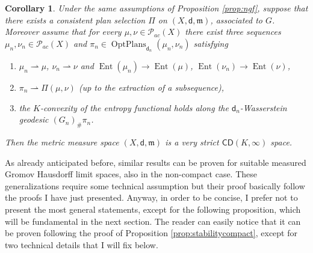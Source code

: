 \documentclass[11pt,twoside,a4paper]{article}
\newcommand{\weakto}{\rightharpoonup}
\newcommand{\CD}{\mathsf{CD}}
\newcommand{\di}{\mathsf d} %
\newcommand{\m}{\mathfrak m} %
\DeclareMathOperator{\Ent}{Ent}
\DeclareMathOperator{\OptPlans}{OptPlans}
\newcommand{\Prob}{\mathscr{P}}
\newcommand{\ProbTwo}{\mathscr{P}_2}
\theoremstyle{theorem}
\newtheorem{corollary}[theorem]{Corollary}
\theoremstyle{definition}
\theoremstyle{remark}
\theoremstyle{proof}
\begin{document}
\begin{corollary}
Under the same assumptions of Proposition \ref{prop:ngf}, suppose that there exists a consistent plan selection $\Pi$ on $(X,\di,\m)$, associated to $G$. Moreover assume that for every $\mu,\nu\in\Prob_{ac}(X)$ there exist three sequences $\mu_n,\nu_n \in \Prob_{ac}(X)$ and $\pi_n\in \OptPlans_{\di_n}(\mu_n,\nu_n)$ satisfying
\begin{enumerate}
    \item $\mu_n \weakto \mu$, $\nu_n \weakto \nu$ and $\Ent(\mu_n)\to \Ent(\mu)$, $\Ent(\nu_n)\to\Ent(\nu)$,
    \item $\pi_n \weakto \Pi(\mu,\nu)$ (up to the extraction of a subsequence),
    \item the $K$-convexity of the entropy functional holds along the $\di_n$-Wasserstein geodesic $(G_n)_\# \pi_n$.
\end{enumerate}
Then the metric measure space $(X,\di,\m)$ is a very strict $\CD(K,\infty)$ space.
\end{corollary}


As already anticipated before, similar results can be proven for suitable measured Gromov Hausdorff limit spaces, also in the non-compact case. These generalizations require some technical assumption but their proof basically follow the proofs I have just presented. Anyway, in order to be concise, I prefer not to present the most general statements, except for the following proposition, which will be fundamental in the next section. The reader can easily notice that it can be proven following the proof of Proposition \ref{prop:stabilitycompact}, except for two technical details that I will fix below.
\end{document}
